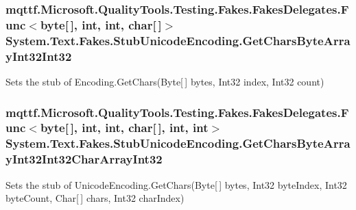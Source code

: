 \hypertarget{class_system_1_1_text_1_1_fakes_1_1_stub_unicode_encoding_ae38c8e73cd08d0b82e07ac6dd14e8e40}{
\subsubsection[{Get\-Chars\-Byte\-Array\-Int32\-Int32}]{\setlength{\rightskip}{0pt plus 5cm}mqttf.\-Microsoft.\-Quality\-Tools.\-Testing.\-Fakes.\-Fakes\-Delegates.\-Func$<$byte\mbox{[}$\,$\mbox{]}, int, int, char\mbox{[}$\,$\mbox{]}$>$ System.\-Text.\-Fakes.\-Stub\-Unicode\-Encoding.\-Get\-Chars\-Byte\-Array\-Int32\-Int32}}\label{class_system_1_1_text_1_1_fakes_1_1_stub_unicode_encoding_ae38c8e73cd08d0b82e07ac6dd14e8e40}


Sets the stub of Encoding.\-Get\-Chars(\-Byte\mbox{[}$\,$\mbox{]} bytes, Int32 index, Int32 count)

\hypertarget{class_system_1_1_text_1_1_fakes_1_1_stub_unicode_encoding_ab0e0a16a23425043897d06723d7aa78a}{
\subsubsection[{Get\-Chars\-Byte\-Array\-Int32\-Int32\-Char\-Array\-Int32}]{\setlength{\rightskip}{0pt plus 5cm}mqttf.\-Microsoft.\-Quality\-Tools.\-Testing.\-Fakes.\-Fakes\-Delegates.\-Func$<$byte\mbox{[}$\,$\mbox{]}, int, int, char\mbox{[}$\,$\mbox{]}, int, int$>$ System.\-Text.\-Fakes.\-Stub\-Unicode\-Encoding.\-Get\-Chars\-Byte\-Array\-Int32\-Int32\-Char\-Array\-Int32}}\label{class_system_1_1_text_1_1_fakes_1_1_stub_unicode_encoding_ab0e0a16a23425043897d06723d7aa78a}


Sets the stub of Unicode\-Encoding.\-Get\-Chars(\-Byte\mbox{[}$\,$\mbox{]} bytes, Int32 byte\-Index, Int32 byte\-Count, Char\mbox{[}$\,$\mbox{]} chars, Int32 char\-Index)

